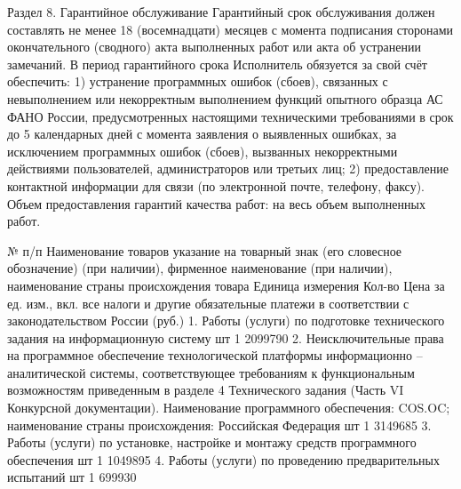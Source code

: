 Раздел 8. Гарантийное обслуживание
Гарантийный срок обслуживания должен составлять не менее 18 (восемнадцати) месяцев с момента подписания сторонами окончательного (сводного) акта выполненных работ или акта об устранении замечаний.
В период гарантийного срока Исполнитель обязуется за свой счёт обеспечить:
1) устранение программных ошибок (сбоев), связанных с невыполнением или некорректным выполнением функций опытного образца АС  ФАНО России, предусмотренных настоящими техническими требованиями в срок до 5 календарных дней с момента заявления о выявленных ошибках, за исключением программных ошибок (сбоев), вызванных некорректными действиями пользователей, администраторов или третьих лиц;
2) предоставление контактной информации для связи (по электронной почте, телефону, факсу).
Объем предоставления гарантий качества работ: на весь объем выполненных работ.



№ п/п
Наименование товаров указание на товарный знак (его словесное обозначение) (при наличии), фирменное наименование (при наличии), наименование страны происхождения товара
Единица 
измерения
Кол-во
Цена за ед. изм., вкл. все налоги и другие обязательные платежи в соответствии с законодательством России (руб.)
1.
Работы (услуги) по подготовке технического задания на информационную систему
шт
1
2099790     
2.
Неисключительные права на программное обеспечение технологической платформы информационно – аналитической системы, соответствующее требованиям к функциональным возможностям приведенным в разделе 4 Технического задания (Часть VI  Конкурсной документации). Наименование программного обеспечения: COS.OC;
наименование страны происхождения: Российская Федерация
шт
1
3149685     
3.
Работы (услуги) по установке, настройке и монтажу средств программного обеспечения
шт
1
1049895     
4.
Работы (услуги) по проведению предварительных испытаний
шт
1
699930     



